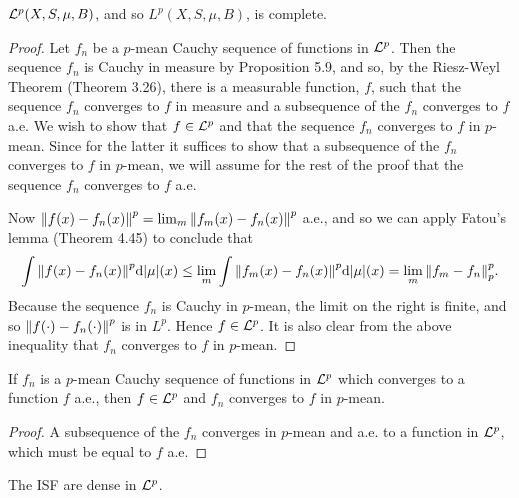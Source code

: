 \begin{theorem}
${\cal L}^p(X,S,\mu,B)$, and so $L^p(X,S,\mu,B)$, is complete.
\end{theorem}

\begin{proof}
Let $f_n$ be a $p$-mean Cauchy sequence of functions in ${\cal L}^p$. Then the sequence $f_n$ is Cauchy in measure by Proposition 5.9, and so, by the Riesz-Weyl Theorem (Theorem 3.26), there is a measurable function, $f$, such that the sequence $f_n$ converges to $f$ in measure and a subsequence of the $f_n$ converges to $f$ a.e. We wish to show that $f\in{\cal L}^p$ and that the sequence $f_n$ converges to $f$ in $p$-mean. Since for the latter it suffices to show that a subsequence of the $f_n$ converges to $f$ in $p$-mean, we will assume for the rest of the proof that the sequence $f_n$ converges to $f$ a.e.

Now $\norm{f(x)-f_n(x)}^p=\lim_m\norm{f_m(x)-f_n(x)}^p$ a.e., and so we can apply Fatou's lemma (Theorem 4.45) to conclude that $$\int\norm{f(x)-f_n(x)}^p\dd|\mu|(x)\leq\lim _m\int\norm{f_m(x)-f_n(x)}^p\dd|\mu|(x)=\lim_m\norm{f_m-f_n}_p^p.$$ Because the sequence $f_n$ is Cauchy in $p$-mean, the limit on the right is finite, and so $\norm{f(\cdot)-f_n(\cdot)}^p$ is in $L^p$. Hence $f\in{\cal L}^p$. It is also clear from the above inequality that $f_n$ converges to $f$ in $p$-mean.
\end{proof}

\begin{corollary}
If $f_n$ is a $p$-mean Cauchy sequence of functions in ${\cal L}^p$ which converges to a function $f$ a.e., then $f\in{\cal L}^p$ and $f_n$ converges to $f$ in $p$-mean.
\end{corollary}

\begin{proof}
A subsequence of the $f_n$ converges in $p$-mean and a.e. to a function in ${\cal L}^p$, which must be equal to $f$ a.e.
\end{proof}

\begin{theorem}
The ISF are dense in ${\cal L}^p$.
\end{theorem}

